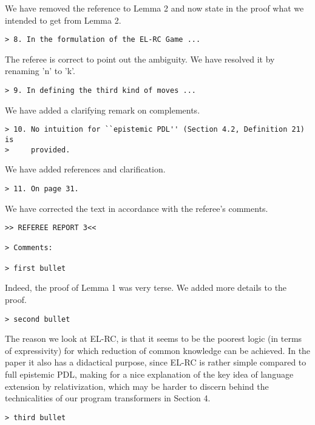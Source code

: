 \documentclass{article}
\begin{document}
We have removed the reference to Lemma 2 and now state in the proof
what we intended to get from Lemma 2.

\begin{verbatim}
> 8. In the formulation of the EL-RC Game ...
\end{verbatim}

The referee is correct to point out the ambiguity. We have resolved
it by renaming 'n' to 'k'.

\begin{verbatim}
> 9. In defining the third kind of moves ...
\end{verbatim}

We have added a clarifying remark on complements.

\begin{verbatim}
> 10. No intuition for ``epistemic PDL'' (Section 4.2, Definition 21) is
>     provided.
\end{verbatim} 

We have added references and clarification. 

\begin{verbatim}
> 11. On page 31.
\end{verbatim}

We have corrected the text in accordance with the referee's comments.

\begin{verbatim}
>> REFEREE REPORT 3<<

> Comments:

> first bullet
\end{verbatim} 

Indeed, the proof of Lemma 1 was very terse.
We added more details to the proof.

\begin{verbatim} 
> second bullet
\end{verbatim}

The reason we look at EL-RC, is that it seems to be the poorest
logic (in terms of expressivity) for which reduction of common
knowledge can be achieved. In the paper it also has a didactical
purpose, since EL-RC is rather simple compared to full epistemic
PDL, making for a nice explanation of the key idea of language
extension by relativization, which may be harder to discern behind the
technicalities of our program transformers in Section 4.

\begin{verbatim}
> third bullet
\end{verbatim}
\end{document}
